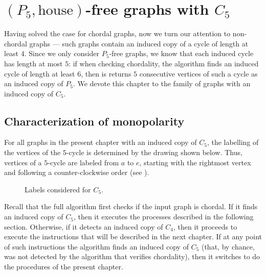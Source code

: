 \chapter{\texorpdfstring{$(P_5,\text{house})$}{(P5,house)}-free graphs with \texorpdfstring{$C_5$}{C5}}
\label{cap:c5}

Having solved the case for chordal graphs, now we turn our attention to
non-chordal graphs --- such graphs contain an induced copy of a cycle of length
at least $4$. Since we only consider $P_5$-free graphs, we know that each
induced cycle has length at most $5$: if when checking chordality, the algorithm
finds an induced cycle of length at least $6$, then is returns $5$ consecutive
vertices of such a cycle as an induced copy of $P_5$. We devote this chapter to
the family of graphs with an induced copy of $C_5$.


\section{Characterization of monopolarity}
\label{sec:c5_characterization}

For all graphs in the present chapter with an induced copy of $C_5$, the
labelling of the vertices of the $5$-cycle is determined by the drawing shown
below. Thus, vertices of a $5$-cycle are labeled from $a$ to $e$, starting with
the rightmost vertex and following a counter-clockwise order (see
).

\begin{figure}[htb!]
        \centering
        \caption{Labels considered for $C_5$.}
        \label{fig:labels_c5}
    \end{figure}

Recall that the full algorithm first checks if the input graph is chordal. If it
finds an induced copy of $C_5$, then it executes the processes described in the
following section. Otherwise, if it detects an induced copy of $C_4$, then it
proceeds to execute the instructions that will be described in the next chapter.
If at any point of such instructions the algorithm finds an induced copy of
$C_5$ (that, by chance, was not detected by the algorithm that verifies
chordality), then it switches to do the procedures of the present chapter.

